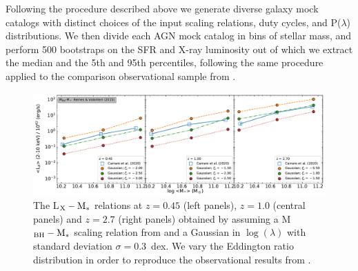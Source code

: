 Following the procedure described above we generate diverse galaxy mock catalogs with distinct choices of the input scaling relations, duty cycles, and P($\lambda$) distributions. 
We then divide each AGN mock catalog in bins of stellar mass, and perform 500 bootstraps on the SFR and X-ray luminosity out of which we extract the median 
and the 5th and 95th percentiles, following the same procedure applied to the comparison observational sample from \citet{2020A&A...642A..65C}. 

\begin{figure}
\begin{center}
  \includegraphics[width=\textwidth]{Figs/Chapter3/fig3.pdf}
  \caption{The L$_{\rm X}-{\rm M}_*$ relations at $z=0.45$ (left panels), $z=1.0$ (central panels) and $z=2.7$ (right panels) obtained by assuming a M$_{\rm BH}-{\rm M}_*$ scaling relation from \citet{2015ApJ...813...82R} and a Gaussian in $\log (\lambda)$ with standard deviation $\sigma=0.3$~dex. We vary the Eddington ratio distribution in order to reproduce the observational results from  \citet{2020A&A...642A..65C}.}

    \label{fig:LX_M_redshift}
\end{center}
\end{figure}

